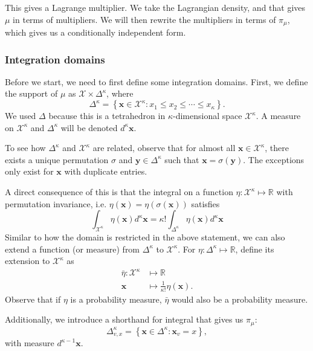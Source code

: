 \documentclass[12pt]{article}
\numberwithin{equation}{section}
\begin{document}
This gives a Lagrange multiplier. We take the Lagrangian density, and that gives $\mu$ in terms of multipliers. We will then rewrite the multipliers
in terms of $\pi_\mu$, which gives us a conditionally independent form.

\subsubsection{Integration domains}

Before we start, we need to first define some integration domains. First, we define the support of $\mu$ as $\mathcal{X}\times\Delta^\kappa$,
where
\begin{equation}
    \Delta^\kappa = \left\{\mathbf{x}\in\mathcal{X}^\kappa: x_1\leq x_2\leq \cdots \leq x_\kappa\right\}.
\end{equation}
We used $\Delta$ because this is a tetrahedron in $\kappa$-dimensional space $\mathcal{X}^\kappa$. A measure on $\mathcal{X}^\kappa$ and $\Delta^\kappa$ will be denoted $d^{\kappa}\mathbf{x}$.

To see how $\Delta^\kappa$ and $\mathcal{X}^\kappa$ are related, observe that for almost all $\mathbf{x}\in\mathcal{X}^\kappa$, there exists
a unique permutation $\sigma$ and $\mathbf{y}\in\Delta^\kappa$ such that $\mathbf{x}=\sigma(\mathbf{y})$. The exceptions only exist for $\mathbf{x}$
with duplicate entries.

A direct consequence of this is that the integral on a function $\eta: \mathcal{X}^\kappa\mapsto \mathbb{R}$ with permutation invariance, i.e. $\eta(\mathbf{x}) = \eta(\sigma(\mathbf{x}))$ satisfies
\begin{equation*}
    \int_{\mathcal{X}^\kappa} \eta(\mathbf{x}) d^\kappa \mathbf{x} = \kappa!\int_{\Delta^\kappa} \eta(\mathbf{x}) d^\kappa \mathbf{x}
\end{equation*}
Similar to how the domain is restricted in the above statement, we can also extend a function (or measure) from $\Delta^\kappa$ to $\mathcal{X}^\kappa$. For $\eta: \Delta^\kappa\mapsto \mathbb{R}$, define its extension to $\mathcal{X}^\kappa$ as
\begin{align*}
    \bar{\eta}:\mathcal{X}^\kappa & \mapsto\mathbb{R}                          \\
    \mathbf{x}                    & \mapsto \frac{1}{\kappa!}\eta(\mathbf{x}).
\end{align*}
Observe that if $\eta$ is a probability measure, $\bar{\eta}$ would also be a probability measure.

Additionally, we introduce a shorthand for integral that gives us $\pi_\mu$:
\begin{equation}
    \Delta^\kappa_{v, x} = \left\{\mathbf{x}\in\Delta^\kappa: \mathbf{x}_v = x\right\},
\end{equation}
with measure $d^{\kappa-1}\mathbf{x}$.
\end{document}
